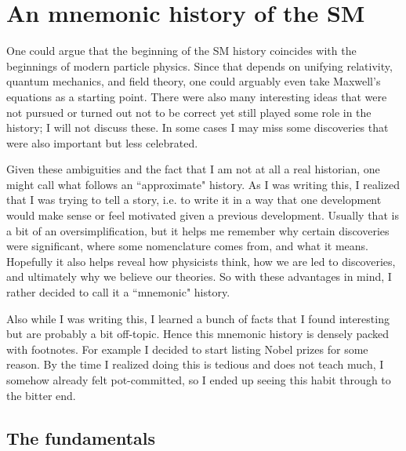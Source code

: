 \section{An mnemonic history of the SM}

One could argue that the beginning of the SM history coincides with the
beginnings of modern particle physics. Since that depends on unifying
relativity, quantum mechanics, and field theory, one could arguably even take
Maxwell's equations as a starting point. 
There were also many interesting ideas that were not pursued or turned out
not to be correct yet still played some role in the history; I will not
discuss these. In some cases I may miss some discoveries that were also
important but less celebrated.

Given these ambiguities and the fact
that I am not at all a real historian, 
one might call what follows an ``approximate" history.
As I was writing this, I realized that I was trying to tell a story, i.e.
to write it in a way that one development would make sense or feel
motivated given a previous development. Usually that is a bit of an
oversimplification, but it helps me remember why certain discoveries were
significant, where some nomenclature comes from, and what it means. Hopefully it
also helps reveal how physicists think, how we are led to discoveries, and
ultimately why we believe our theories. So with these advantages in mind, I
rather decided to call it a ``mnemonic" history. 

Also while I was writing this, I learned a bunch of facts that I found
interesting but are probably a bit off-topic. Hence this mnemonic history is
densely packed with footnotes. For example I decided to start listing Nobel
prizes for some reason. By the time I realized doing this is tedious and does not
teach much, I somehow already felt pot-committed, so I ended up seeing this habit
through to the bitter end. 

\subsection{The fundamentals}


